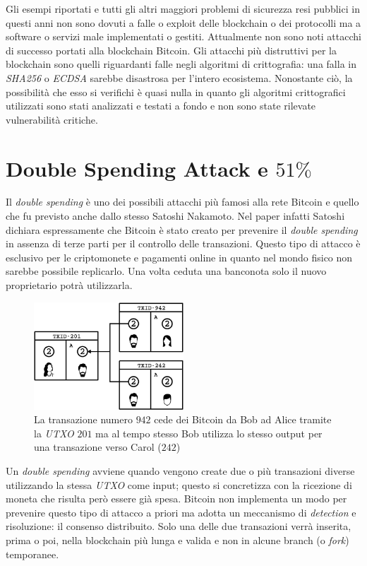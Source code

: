 Gli esempi riportati e tutti gli altri maggiori problemi di sicurezza resi pubblici in questi anni non sono dovuti a falle o exploit delle blockchain o dei protocolli ma a software o servizi male implementati o gestiti. Attualmente non sono noti attacchi di successo portati alla blockchain Bitcoin.\newline
Gli attacchi più distruttivi per la blockchain sono quelli riguardanti falle negli algoritmi di crittografia: una falla in \textit{SHA256} o \textit{ECDSA} sarebbe disastrosa per l'intero ecosistema. Nonostante ciò, la possibilità che esso si verifichi è quasi nulla in quanto gli algoritmi crittografici utilizzati sono stati analizzati e testati a fondo e non sono state rilevate vulnerabilità critiche.

\section{Double Spending Attack e $51\%$}
Il \textit{double spending} è uno dei possibili attacchi più famosi alla rete Bitcoin e quello che fu previsto anche dallo stesso Satoshi Nakamoto. Nel paper infatti Satoshi dichiara espressamente che Bitcoin è stato creato per prevenire il \textit{double spending} in assenza di terze parti per il controllo delle transazioni.\newline
Questo tipo di attacco è esclusivo per le criptomonete e pagamenti online in quanto nel mondo fisico non sarebbe possibile replicarlo. Una volta ceduta una banconota solo il nuovo proprietario potrà utilizzarla.
\begin{figure}
    \centering
    \includegraphics[width=0.5\textwidth]{images/double_spending.png}
    \caption{La transazione numero $942$ cede dei Bitcoin da Bob ad Alice tramite la \textit{UTXO} $201$ ma al tempo stesso Bob utilizza lo stesso output per una transazione verso Carol ($242$) \cite{owning}}
\end{figure}
Un \textit{double spending} avviene quando vengono create due o più transazioni diverse utilizzando la stessa \textit{UTXO} come input; questo si concretizza con la ricezione di moneta che risulta però essere già spesa. Bitcoin non implementa un modo per prevenire questo tipo di attacco a priori ma adotta un meccanismo di \textit{detection} e risoluzione: il consenso distribuito. Solo una delle due transazioni verrà inserita, prima o poi, nella blockchain più lunga e valida e non in alcune branch (o \textit{fork}) temporanee.\newline
